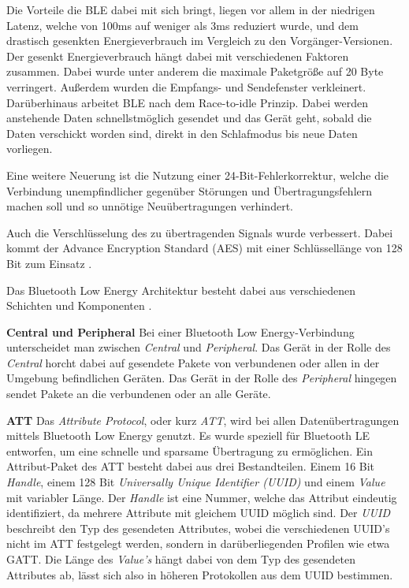 Die Vorteile die BLE dabei mit sich bringt, liegen vor allem in der niedrigen Latenz, welche von 100ms auf weniger als 3ms reduziert wurde, und dem drastisch gesenkten Energieverbrauch im Vergleich zu den Vorgänger-Versionen. Der gesenkt Energieverbrauch hängt dabei mit verschiedenen Faktoren zusammen. 
Dabei wurde unter anderem die maximale Paketgröße auf 20 Byte verringert. Außerdem wurden die Empfangs- und Sendefenster verkleinert. 
Darüberhinaus arbeitet BLE nach dem Race-to-idle Prinzip. Dabei werden anstehende Daten schnellstmöglich gesendet und das Gerät geht, sobald die Daten verschickt worden sind, direkt in den Schlafmodus bis neue Daten vorliegen.

Eine weitere Neuerung ist die Nutzung einer 24-Bit-Fehlerkorrektur, welche die Verbindung unempfindlicher gegenüber Störungen und Übertragungsfehlern machen soll und so unnötige Neuübertragungen verhindert.

Auch die Verschlüsselung des zu übertragenden Signals wurde verbessert. Dabei kommt der Advance Encryption Standard (AES) mit einer Schlüssellänge von 128 Bit zum Einsatz \cite{blespecs}. 

Das Bluetooth Low Energy Architektur besteht dabei aus verschiedenen Schichten und Komponenten \cite{blespecsnordic}.

\textbf{Central und Peripheral}
Bei einer Bluetooth Low Energy-Verbindung unterscheidet man zwischen \emph{Central} und \emph{Peripheral}. Das Gerät in der Rolle des \emph{Central} horcht dabei auf gesendete Pakete von verbundenen oder allen in der Umgebung befindlichen Geräten. Das Gerät in der Rolle des \emph{Peripheral} hingegen sendet Pakete an die verbundenen oder an alle Geräte.


\textbf{ATT}
Das \emph{Attribute Protocol}, oder kurz \emph{ATT}, wird bei allen Datenübertragungen mittels Bluetooth Low Energy genutzt. Es wurde speziell für Bluetooth LE entworfen, um eine schnelle und sparsame Übertragung zu ermöglichen. 
Ein Attribut-Paket des ATT besteht dabei aus drei Bestandteilen. Einem 16 Bit \emph{Handle}, einem 128 Bit \emph{Universally Unique Identifier (UUID)} und einem \emph{Value} mit variabler Länge.
Der \emph{Handle} ist eine Nummer, welche das Attribut eindeutig identifiziert, da mehrere Attribute mit gleichem UUID möglich sind.
Der \emph{UUID} beschreibt den Typ des gesendeten Attributes, wobei die verschiedenen UUID's nicht im ATT festgelegt werden, sondern in darüberliegenden Profilen wie etwa GATT.
Die Länge des \emph{Value's} hängt dabei von dem Typ des gesendeten Attributes ab, lässt sich also in höheren Protokollen aus dem UUID bestimmen.

